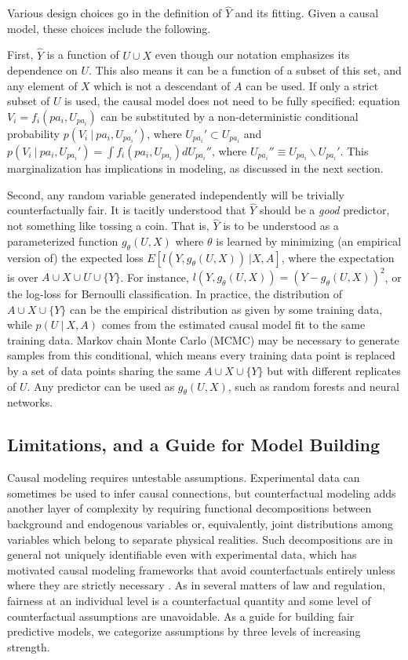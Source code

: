 Various design choices go in the definition of $\hat Y$ and its fitting. Given a causal model, these choices include the following.

First, $\hat Y$ is a function of $U \cup X$ even though our notation emphasizes its dependence on $U$. This also means it can be a function of a subset of this set, and any element of $X$ which is not a descendant of $A$ can be used. If only a strict subset of $U$ is used, the causal model does not need to be fully specified: equation $V_i = f_i(pa_i, U_{pa_i})$ can be substituted by a non-deterministic conditional probability $p(V_i\ |\ pa_i, U_{pa_i}')$, where $U_{pa_i}' \subset U_{pa_i}$ and $p(V_i\ |\ pa_i, U_{pa_i}') = \int f_i(pa_i, U_{pa_i}) d U_{pa_i}''$, where $U_{pa_i}'' \equiv U_{pa_i} \backslash U_{pa_i}'$. This marginalization has implications in modeling, as discussed in the next section.

Second, any random variable generated independently will be trivially counterfactually fair. It is tacitly understood that $\hat Y$ should be a {\it good} predictor, not something like tossing a coin. That is, $\hat Y$ is to be understood as a parameterized function $g_\theta(U, X)$ where $\theta$ is learned by minimizing (an empirical version of) the expected loss $E[l(Y, g_\theta(U, X))\ | X,
  A]$, where the expectation is over $A \cup X \cup U \cup \{Y\}$. For instance, $l(Y, g_\theta(U, X)) = (Y - g_\theta(U, X))^2$, or the log-loss for Bernoulli classification.  In practice, the distribution of $A \cup X \cup \{Y\}$ can be the empirical distribution as given by some training data, while $p(U\ |\ X, A)$ comes from the estimated causal model fit to the same training data. Markov chain Monte Carlo (MCMC) may be necessary to generate samples from this conditional, which means every training data point is replaced by a set of data points sharing the same $A \cup X \cup \{Y\}$ but with different replicates of $U$. Any predictor can be used as $g_\theta(U, X)$, such as random forests and neural networks.

\subsection{Limitations, and a Guide for Model Building}

Causal modeling requires untestable assumptions. Experimental data can sometimes be used to infer causal connections, but counterfactual modeling adds another layer of complexity by requiring functional decompositions between background and endogenous variables or, equivalently, joint distributions among variables which belong to separate physical realities. Such decompositions are in general not uniquely identifiable even with experimental data, which has motivated causal modeling frameworks that avoid counterfactuals entirely unless where they are strictly necessary \citep{dawid:00}. As in several matters of law and regulation, fairness at an individual level is a counterfactual quantity and some level of counterfactual assumptions are unavoidable. As a guide for building fair predictive models, we categorize assumptions by three levels of increasing strength.

